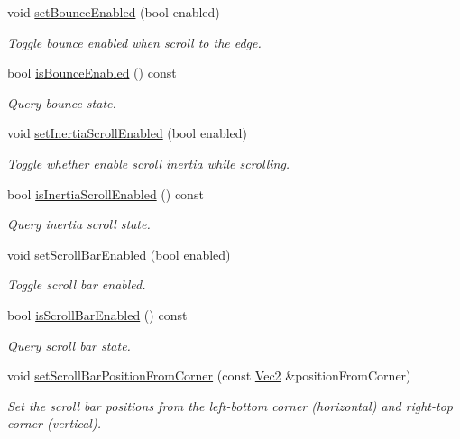 \begin{DoxyCompactItemize}
void \hyperlink{classui_1_1ScrollView_ae46c7b9ef733a28bd5da8384a2e0f161}{set\+Bounce\+Enabled} (bool enabled)
\begin{DoxyCompactList}\small\item\em Toggle bounce enabled when scroll to the edge. \end{DoxyCompactList}\item 
bool \hyperlink{classui_1_1ScrollView_af3426fc20a207cf5e36bd3fc20b65a8e}{is\+Bounce\+Enabled} () const
\begin{DoxyCompactList}\small\item\em Query bounce state. \end{DoxyCompactList}\item 
void \hyperlink{classui_1_1ScrollView_aa8fc63dd4911dad972c05086145e8a68}{set\+Inertia\+Scroll\+Enabled} (bool enabled)
\begin{DoxyCompactList}\small\item\em Toggle whether enable scroll inertia while scrolling. \end{DoxyCompactList}\item 
bool \hyperlink{classui_1_1ScrollView_a10a4b20f943bef8175ed053d05921026}{is\+Inertia\+Scroll\+Enabled} () const
\begin{DoxyCompactList}\small\item\em Query inertia scroll state. \end{DoxyCompactList}\item 
void \hyperlink{classui_1_1ScrollView_a074e7a96ccc182b36068573b028af33e}{set\+Scroll\+Bar\+Enabled} (bool enabled)
\begin{DoxyCompactList}\small\item\em Toggle scroll bar enabled. \end{DoxyCompactList}\item 
bool \hyperlink{classui_1_1ScrollView_a8b5a35f6f822117b2bef77904a87566c}{is\+Scroll\+Bar\+Enabled} () const
\begin{DoxyCompactList}\small\item\em Query scroll bar state. \end{DoxyCompactList}\item 
void \hyperlink{classui_1_1ScrollView_a73cc3e15cbfbe923f63ead0db6f71de0}{set\+Scroll\+Bar\+Position\+From\+Corner} (const \hyperlink{classVec2}{Vec2} \&position\+From\+Corner)
\begin{DoxyCompactList}\small\item\em Set the scroll bar positions from the left-\/bottom corner (horizontal) and right-\/top corner (vertical). \end{DoxyCompactList}\item 

\end{DoxyCompactItemize}
